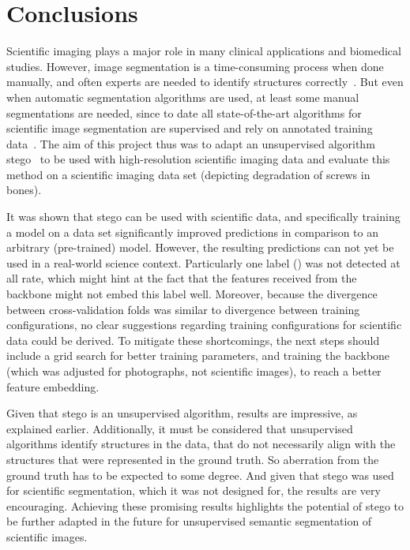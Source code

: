 \section{Conclusions}\label{sec:conclusions}
Scientific imaging plays a major role in many clinical applications and biomedical studies.
However, image segmentation is a time-consuming process when done manually, and often experts are needed to identify structures correctly~\autocite{Litjens2017}.
But even when automatic segmentation algorithms are used, at least some manual segmentations are needed, since to date all state-of-the-art algorithms for scientific image segmentation are supervised and rely on annotated training data~\autocite{Litjens2017}.
The aim of this project thus was to adapt an unsupervised algorithm \gls{stego}~\autocite{Hamilton2022} to be used with high-resolution scientific imaging data and evaluate this method on a scientific imaging data set (depicting degradation of screws in bones).

It was shown that \gls{stego} can be used with scientific data, and specifically training a model on a data set significantly improved predictions in comparison to an arbitrary (pre-trained) model.
However, the resulting predictions can not yet be used in a real-world science context.
Particularly one label () was not detected at all rate, which might hint at the fact that the features received from the backbone might not embed this label well.
Moreover, because the divergence between cross-validation folds was similar to divergence between training configurations, no clear suggestions regarding training configurations for scientific data could be derived.
To mitigate these shortcomings, the next steps should include a grid search for better training parameters, and training the backbone (which was adjusted for photographs, not scientific images), to reach a better feature embedding.

Given that \gls{stego} is an unsupervised algorithm, results are impressive, as explained earlier.
Additionally, it must be considered that unsupervised algorithms identify structures in the data, that do not necessarily align with the structures that were represented in the ground truth.
So aberration from the ground truth has to be expected to some degree.
And given that \gls{stego} was used for scientific segmentation, which it was not designed for, the results are very encouraging. %
Achieving these promising results highlights the potential of \gls{stego} to be further adapted in the future for unsupervised semantic segmentation of scientific images.

\clearpage 
